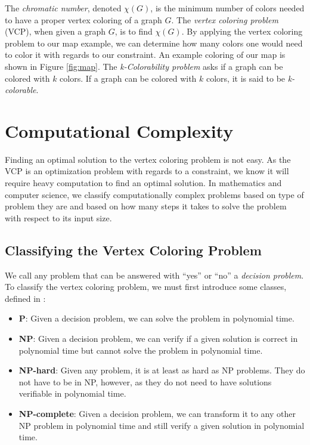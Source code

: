 \documentclass{article}
\theoremstyle{definition}
\begin{document}
The \emph{chromatic number}, denoted $\chi(G)$, is the minimum number of colors needed to have a proper vertex coloring of a graph $G$. The \emph{vertex coloring problem} (VCP), when given a graph $G$, is to find $\chi(G)$. By applying the vertex coloring problem to our map example, we can determine how many colors one would need to color it with regards to our constraint. An example coloring of our map is shown in Figure \ref{fig:map}. The \emph{k-Colorability problem} asks if a graph can be colored with $k$ colors. If a graph can be colored with $k$ colors, it is said to be \emph{k-colorable}.

\section{Computational Complexity}
Finding an optimal solution to the vertex coloring problem is not easy. As the VCP is an optimization problem with regards to a constraint, we know it will require heavy computation to find an optimal solution. In mathematics and computer science, we classify computationally complex problems based on type of problem they are and based on how many steps it takes to solve the problem with respect to its input size.

\subsection{Classifying the Vertex Coloring Problem}
We call any problem that can be answered with ``yes'' or ``no'' a \emph{decision problem}. To classify the vertex coloring problem, we must first introduce some classes, defined in \cite{moret}:

\begin{itemize}
  \item \textbf{P}: Given a decision problem, we can solve the problem in polynomial time.
  \item \textbf{NP}: Given a decision problem, we can verify if a given solution is correct in polynomial time but cannot solve the problem in polynomial time.
  \item \textbf{NP-hard}: Given any problem, it is at least as hard as NP problems. They do not have to be in NP, however, as they do not need to have solutions verifiable in polynomial time.
  \item \textbf{NP-complete}: Given a decision problem, we can transform it to any other NP problem in polynomial time and still verify a given solution in polynomial time.
\end{itemize}
\end{document}
